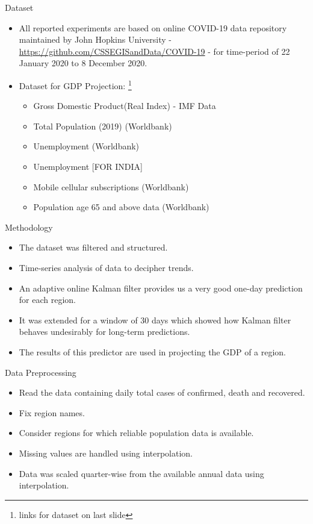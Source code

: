 \documentclass[11pt]{beamer}
\begin{document}
\begin{frame}{Dataset}
\begin{itemize}
\item All reported experiments are based on online COVID-19 data repository maintained by John Hopkins University - \url{https://github.com/CSSEGISandData/COVID-19} - for time-period of 22 January 2020 to 8 December 2020.
\item Dataset for GDP Projection:
\footnote{links for dataset on last slide}
\begin{itemize}
\item Gross Domestic Product(Real Index) - IMF Data 
\item Total Population (2019) (Worldbank) 
\item Unemployment (Worldbank) 
\item Unemployment [FOR INDIA] 
\item Mobile cellular subscriptions (Worldbank)
\item Population age 65 and above data (Worldbank) 
\end{itemize}
\end{itemize}
\end{frame}

\begin{frame}{Methodology}
\begin{itemize}
\item The dataset was filtered and structured.
\item Time-series analysis of data to decipher trends.
\item  An adaptive online Kalman filter provides us a very good one-day prediction for each region.
\item It was extended for a window of 30 days which showed how Kalman filter behaves undesirably for long-term predictions.
\item The results of this predictor are used in projecting the GDP of a region.
\end{itemize}

\end{frame}

\begin{frame}{Data Preprocessing}
\begin{itemize}
\item Read the data containing daily total cases of confirmed, death and recovered.
\item Fix region names.
\item Consider regions for which reliable population data is available.
\item Missing values are handled using interpolation.
\item Data was scaled quarter-wise from the available annual data using interpolation.
\end{itemize}
\end{frame}
\end{document}
